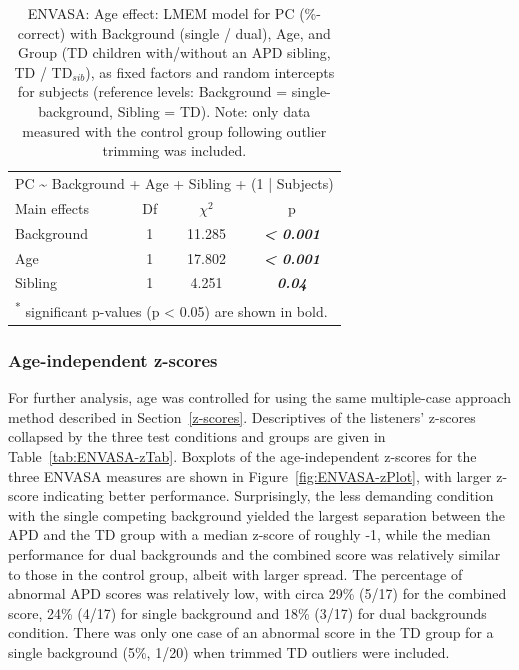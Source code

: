 \documentclass[a4paper, twoside]{templates/ociamthesis}
\begin{document}
\begin{table}

\caption{\label{tab:ENVASA-AgeLMEMTab}ENVASA: Age effect: LMEM model for PC (\%-correct) with Background (single / dual), Age, and Group (TD children with/without an APD sibling, TD / TD$_{sib}$), as fixed factors and random intercepts for subjects (reference levels: Background = single-background, Sibling = TD). Note: only data measured with the control group following outlier trimming was included.}
\centering
\begin{tabular}[t]{lcc>{}c}
\toprule
\multicolumn{4}{c}{PC \textasciitilde{} Background + Age + Sibling + (1 | Subjects)} \\
\cmidrule(l{3pt}r{3pt}){1-4}
Main effects & Df & $\chi^{2}$ & p\\
\midrule
Background & 1 & 11.285 & \em{\textbf{< 0.001}}\\
Age & 1 & 17.802 & \em{\textbf{< 0.001}}\\
Sibling & 1 & 4.251 & \em{\textbf{0.04}}\\
\bottomrule
\multicolumn{4}{l}{\textsuperscript{*} significant p-values (p < 0.05) are shown in bold.}\\
\end{tabular}
\end{table}

\hypertarget{age-independent-z-scores-2}{%
\subsubsection*{Age-independent z-scores}\label{age-independent-z-scores-2}}

For further analysis, age was controlled for using the same multiple-case approach method described in Section~\ref{z-scores}. Descriptives of the listeners' z-scores collapsed by the three test conditions and groups are given in Table~\ref{tab:ENVASA-zTab}. Boxplots of the age-independent z-scores for the three ENVASA measures are shown in Figure~\ref{fig:ENVASA-zPlot}, with larger z-score indicating better performance. Surprisingly, the less demanding condition with the single competing background yielded the largest separation between the APD and the TD group with a median z-score of roughly -1, while the median performance for dual backgrounds and the combined score was relatively similar to those in the control group, albeit with larger spread. The percentage of abnormal APD scores was relatively low, with circa 29\% (5/17) for the combined score, 24\% (4/17) for single background and 18\% (3/17) for dual backgrounds condition. There was only one case of an abnormal score in the TD group for a single background (5\%, 1/20) when trimmed TD outliers were included.\\
\end{document}
